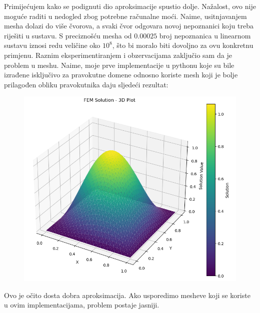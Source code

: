 \documentclass[zavrsnirad]{../fer}
\begin{document}
Primijećujem kako se podignuti dio aproksimacije spustio dolje.
Nažalost, ovo nije moguće raditi u nedogled zbog potrebne 
računalne moći. Naime, usitnjavanjem mesha dolazi do više čvorova, a 
svaki čvor odgovara novoj nepoznanici koju treba riješiti u sustavu. 
S preciznošću mesha od $0.00025$ broj nepoznanica u linearnom sustavu 
iznosi redu veličine oko $10^8$, što bi moralo biti dovoljno za ovu 
 konkretnu primjenu.
\newpage
Raznim eksperimentiranjem i obzervacijama zaključio sam da je problem
u meshu. Naime, moje prve implementacije u pythonu koje su bile izrađene isključivo 
za pravokutne domene odnosno koriste mesh 
koji je bolje prilagođen obliku pravokutnika daju sljedeći rezultat:

\begin{figure}[H]
	\centering
	\includegraphics[width=1.15\linewidth]{Figures/numersinsin.png}
	\caption{}
  \label{numerSinSin}
\end{figure}
Ovo je očito dosta dobra aproksimacija.
\newpage
Ako usporedimo mesheve koji se koriste u ovim implementacijama,
problem postaje jasniji.
\end{document}
